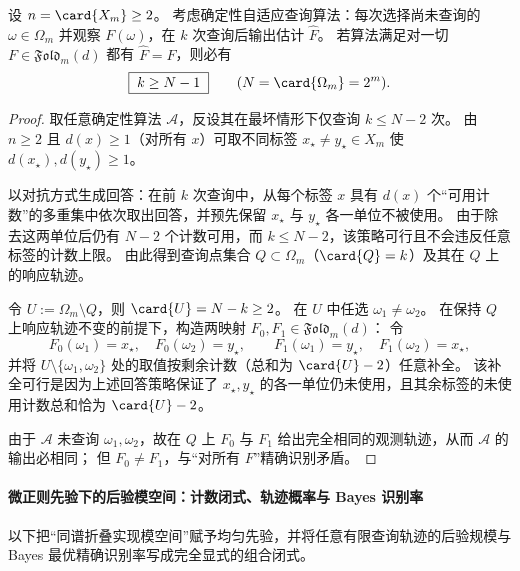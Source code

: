 \begin{theorem}\label{thm:pom-microcanonical-fold-worstcase-query-rigidity}
设 \(n=\card{X_m}\ge 2\)。
考虑确定性自适应查询算法：每次选择尚未查询的 \(\omega\in\Omega_m\) 并观察 \(F(\omega)\)，在 \(k\) 次查询后输出估计 \(\widehat F\)。
若算法满足对一切 \(F\in\mathfrak{Fold}_m(d)\) 都有 \(\widehat F=F\)，则必有
\[
\boxed{\;k\ge N-1\;}
\qquad(N=\card{\Omega_m}=2^m).
\]
\end{theorem}
\begin{proof}
取任意确定性算法 \(\mathcal{A}\)，反设其在最坏情形下仅查询 \(k\le N-2\) 次。
由 \(n\ge 2\) 且 \(d(x)\ge 1\)（对所有 \(x\)）可取不同标签 \(x_\star\neq y_\star\in X_m\) 使 \(d(x_\star),d(y_\star)\ge 1\)。
\par
以对抗方式生成回答：在前 \(k\) 次查询中，从每个标签 \(x\) 具有 \(d(x)\) 个“可用计数”的多重集中依次取出回答，并预先保留 \(x_\star\) 与 \(y_\star\) 各一单位不被使用。
由于除去这两单位后仍有 \(N-2\) 个计数可用，而 \(k\le N-2\)，该策略可行且不会违反任意标签的计数上限。
由此得到查询点集合 \(Q\subset\Omega_m\)（\(\card{Q}=k\)）及其在 \(Q\) 上的响应轨迹。
\par
令 \(U:=\Omega_m\setminus Q\)，则 \(\card{U}=N-k\ge 2\)。
在 \(U\) 中任选 \(\omega_1\neq\omega_2\)。
在保持 \(Q\) 上响应轨迹不变的前提下，构造两映射 \(F_0,F_1\in\mathfrak{Fold}_m(d)\)：
令
\[
F_0(\omega_1)=x_\star,\quad F_0(\omega_2)=y_\star,\qquad
F_1(\omega_1)=y_\star,\quad F_1(\omega_2)=x_\star,
\]
并将 \(U\setminus\{\omega_1,\omega_2\}\) 处的取值按剩余计数（总和为 \(\card{U}-2\)）任意补全。
该补全可行是因为上述回答策略保证了 \(x_\star,y_\star\) 的各一单位仍未使用，且其余标签的未使用计数总和恰为 \(\card{U}-2\)。
\par
由于 \(\mathcal{A}\) 未查询 \(\omega_1,\omega_2\)，故在 \(Q\) 上 \(F_0\) 与 \(F_1\) 给出完全相同的观测轨迹，从而 \(\mathcal{A}\) 的输出必相同；
但 \(F_0\neq F_1\)，与“对所有 \(F\)”精确识别矛盾。
\end{proof}

\paragraph{微正则先验下的后验模空间：计数闭式、轨迹概率与 Bayes 识别率}
以下把“同谱折叠实现模空间”赋予均匀先验，并将任意有限查询轨迹的后验规模与 Bayes 最优精确识别率写成完全显式的组合闭式。

